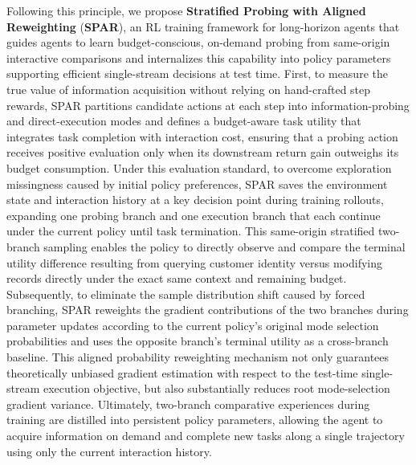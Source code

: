 \documentclass[11pt]{article}
\theoremstyle{definition}
\theoremstyle{remark}
\newcommand{\spar}{\textsc{SPAR}}
\begin{document}
Following this principle, we propose \textbf{Stratified Probing with Aligned Reweighting} (\textbf{\spar{}}), an RL training framework for long-horizon agents that guides agents to learn budget-conscious, on-demand probing from same-origin interactive comparisons and internalizes this capability into policy parameters supporting efficient single-stream decisions at test time.
First, to measure the true value of information acquisition without relying on hand-crafted step rewards, \spar{} partitions candidate actions at each step into information-probing and direct-execution modes and defines a budget-aware task utility that integrates task completion with interaction cost, ensuring that a probing action receives positive evaluation only when its downstream return gain outweighs its budget consumption.
Under this evaluation standard, to overcome exploration missingness caused by initial policy preferences, \spar{} saves the environment state and interaction history at a key decision point during training rollouts, expanding one probing branch and one execution branch that each continue under the current policy until task termination.
This same-origin stratified two-branch sampling enables the policy to directly observe and compare the terminal utility difference resulting from querying customer identity versus modifying records directly under the exact same context and remaining budget.
Subsequently, to eliminate the sample distribution shift caused by forced branching, \spar{} reweights the gradient contributions of the two branches during parameter updates according to the current policy's original mode selection probabilities and uses the opposite branch's terminal utility as a cross-branch baseline.
This aligned probability reweighting mechanism not only guarantees theoretically unbiased gradient estimation with respect to the test-time single-stream execution objective, but also substantially reduces root mode-selection gradient variance.
Ultimately, two-branch comparative experiences during training are distilled into persistent policy parameters, allowing the agent to acquire information on demand and complete new tasks along a single trajectory using only the current interaction history.
\end{document}
